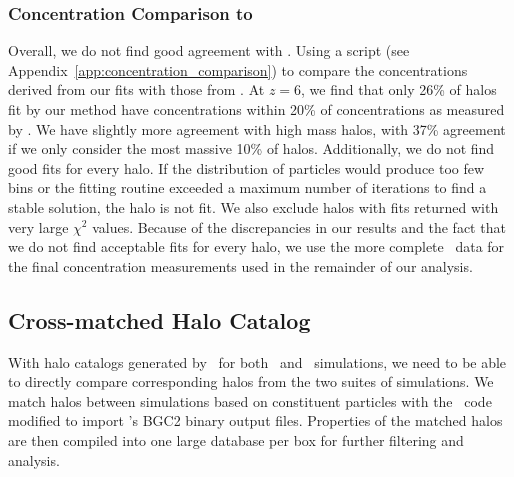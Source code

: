 \subsubsection{Concentration Comparison to \rockstar}
\label{subsubsec:analysis--profile_fitting--rockstar_comparison}


Overall, we do not find good agreement with \rockstar.  Using a script (see Appendix~\ref{app:concentration_comparison}) to compare the concentrations derived from our fits with those from \rockstar.  At $z = 6$, we find that only 26\% of halos fit by our method have concentrations within 20\% of concentrations as measured by \rockstar.  We have slightly more agreement with high mass halos, with 37\% agreement if we only consider the most massive 10\% of halos.  Additionally, we do not find good fits for every halo.  If the distribution of particles would produce too few bins or the fitting routine exceeded a maximum number of iterations to find a stable solution, the halo is not fit.  We also exclude halos with fits returned with very large $\chi^{2}$ values.  Because of the discrepancies in our results and the fact that we do not find acceptable fits for every halo, we use the more complete \rockstar\ data for the final concentration measurements used in the remainder of our analysis.




\subsection{Cross-matched Halo Catalog}
\label{subsec:analysis--catalog}


With halo catalogs generated by \rockstar\ for both \lpt\ and \za\ simulations, we need to be able to directly compare corresponding halos from the two suites of simulations.  We match halos between simulations based on constituent particles with the \crossmatch\ code modified to import \rockstar's BGC2 binary output files.  Properties of the matched halos are then compiled into one large database per box for further filtering and analysis.



